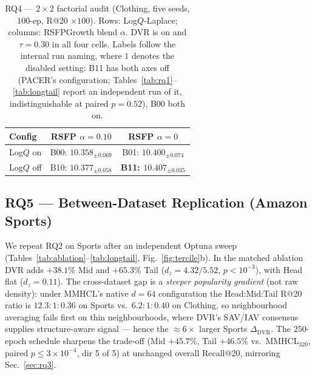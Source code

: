 \documentclass[conference]{IEEEtran}
\newcommand{\dvr}{DVR\xspace}
\begin{document}
\begin{table}[!htbp]
\caption{RQ4 --- $2{\times}2$ factorial audit (Clothing, five seeds,
$100$-ep, R@20 $\times 100$). Rows: Log$Q$-Laplace; columns:
RSFPGrowth blend $\alpha$. \dvr is on and $\tau{=}0.30$ in all four
cells. Labels follow the internal run naming, where $1$ denotes the
disabled setting: B11 has both axes off (PACER's configuration;
Tables~\ref{tab:rq1}--\ref{tab:longtail} report an independent run of
it, indistinguishable at paired $p{=}0.52$), B00 both on.}
\label{tab:factorial}
\centering
\renewcommand{\arraystretch}{1.02}
\setlength{\tabcolsep}{4pt}
\begin{tabular}{lcc}
\toprule
Config & RSFP $\alpha{=}0.10$ & RSFP $\alpha{=}0$ \\
\midrule
Log$Q$ on  & B00: $10.358_{\pm 0.069}$ & B01: $10.400_{\pm 0.074}$ \\
Log$Q$ off & B10: $10.377_{\pm 0.058}$ &
  \textbf{B11: $\mathbf{10.407_{\pm 0.035}}$} \\
\bottomrule
\end{tabular}
\end{table}

\subsection{RQ5 --- Between-Dataset Replication (Amazon Sports)}
\label{sec:rq5}

We repeat RQ2 on Sports after an independent Optuna sweep
(Tables~\ref{tab:ablation}--\ref{tab:longtail},
Fig.~\ref{fig:tercile}b). In the matched ablation \dvr adds
$+38.1\%$ Mid and $+65.3\%$ Tail ($d_z{=}4.32/5.52$,
$p{<}10^{-3}$), with Head flat ($d_z{=}0.11$).
The cross-dataset gap is a \emph{steeper popularity gradient} (not
raw density): under MMHCL's native $d{=}64$ configuration the
Head{:}Mid{:}Tail R@20 ratio is
$12.3{:}1{:}0.36$ on Sports vs.\ $6.2{:}1{:}0.40$ on Clothing, so
neighbourhood averaging fails first on thin neighbourhoods, where
\dvr's SAV/IAV consensus supplies structure-aware signal --- hence the
${\approx}6{\times}$ larger Sports $\Delta_{\text{DVR}}$. The $250$-epoch schedule sharpens the
trade-off (Mid $+45.7\%$, Tail $+46.5\%$ vs.\ MMHCL$_{320}$, paired
$p{\le}3{\times}10^{-4}$, dir 5 of 5) at unchanged
overall Recall@20, mirroring Sec.~\ref{sec:rq3}.

\end{document}
